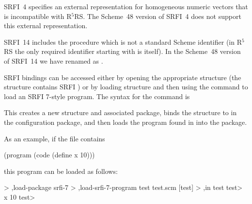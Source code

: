 SRFI~4 specifies an external representation for homogeneous numeric
vectors that is incompatible with R$^5$RS.  The Scheme~48 version of
SRFI~4 does not support this external representation.

SRFI~14 includes the procedure  which is not a standard
 Scheme identifier (in R$^5$RS the only required identifier starting
 with \code{-} is \code{-} itself).
In the Scheme~48 version of SRFI~14 we have renamed 
 as .

SRFI bindings can be accessed
either by opening the appropriate structure
 (the structure  contains SRFI )
 or by loading structure  and then using
 the  command to load an SRFI 7-style program.
The syntax for the command is
\begin{example}
\end{example}
This creates a new structure and associated package, binds the structure
 to  in the configuration package, and then loads the program
 found in  into the package.

As an example, if the file  contains
\begin{example}
(program (code (define x 10)))
\end{example}
this program can be loaded as follows:
\begin{example}
> ,load-package srfi-7
> ,load-srfi-7-program test test.scm
[test]
> ,in test
test> x
10
test> 
\end{example}

